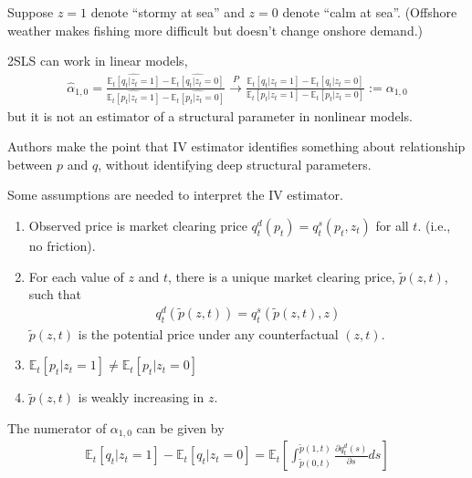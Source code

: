\documentclass[11pt]{elegantbook}
\begin{document}
Suppose $z=1$ denote ``stormy at sea'' and $z=0$ denote ``calm at sea''. (Offshore weather makes fishing more difficult but doesn't change onshore demand.)

2SLS can work in linear models,
\begin{equation}
    \begin{aligned}
        \hat{\alpha}_{1,0}=\frac{\widehat{\mathbb{E}_t[q_t|z_t=1]}-\widehat{\mathbb{E}_t[q_t|z_t=0]}}{\widehat{\mathbb{E}_t[p_t|z_t=1]}-\widehat{\mathbb{E}_t[p_t|z_t=0]}}\stackrel{P}{\longrightarrow}\frac{\mathbb{E}_t[q_t|z_t=1]-\mathbb{E}_t[q_t|z_t=0]}{\mathbb{E}_t[p_t|z_t=1]-\mathbb{E}_t[p_t|z_t=0]}:= \alpha_{1,0}
    \end{aligned}
    \nonumber
\end{equation}
but it is not an estimator of a structural parameter in nonlinear models.

\begin{claim}
    Authors make the point that IV estimator identifies something about relationship between $p$ and $q$, without identifying deep structural parameters.
\end{claim}

Some assumptions are needed to interpret the IV estimator.
\begin{assumption}
    \begin{enumerate}
        \item Observed price is market clearing price $q^d_t(p_t)=q^s_t(p_t,z_t)$ for all $t$. (i.e., no friction).
        \item For each value of $z$ and $t$, there is a unique market clearing price, $\tilde{p}(z,t)$, such that
        \begin{equation}
            \begin{aligned}
                q^d_t(\tilde{p}(z,t))=q^s_t(\tilde{p}(z,t),z)
            \end{aligned}
            \nonumber
        \end{equation}
        $\tilde{p}(z,t)$ is the potential price under any counterfactual $(z,t)$.
        \item $\mathbb{E}_t[p_t|z_t=1]\neq\mathbb{E}_t[p_t|z_t=0]$
        \item $\tilde{p}(z,t)$ is weakly increasing in $z$.
    \end{enumerate}
\end{assumption}


\begin{lemma}
    The numerator of $\alpha_{1,0}$ can be given by
    \begin{equation}
        \begin{aligned}
            \mathbb{E}_t[q_t|z_t=1]-\mathbb{E}_t[q_t|z_t=0]=\mathbb{E}_t\left[\int_{\tilde{p}(0,t)}^{\tilde{p}(1,t)}\frac{\partial q^d_t(s)}{\partial s}ds\right]
        \end{aligned}
        \nonumber
    \end{equation}
\end{lemma}
\end{document}
